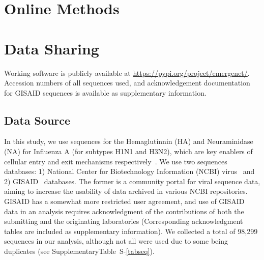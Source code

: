 \documentclass[onecolumn, compsoc,10pt]{IEEEtran}
\def\SUPPLEMENTARY{Supplementary}
\def\METHODS{Online Methods\xspace}
\begin{document}
\section*{\METHODS}






\section*{Data Sharing} 

Working software is publicly available at \href{https://pypi.org/project/quasinet/}{https://pypi.org/project/emergenet/}.
Accession numbers of all sequences used, and acknowledgement documentation for GISAID sequences is available as supplementary information.





\subsection*{Data Source}

In this study, we use sequences for the Hemaglutinnin (HA)  and Neuraminidase (NA) for Influenza A (for subtypes H1N1 and H3N2), which are key enablers of cellular entry and exit mechanisms respectively~\cite{mcauley2019influenza}. We use two sequences databases: 1) National Center for Biotechnology Information (NCBI) virus~\cite{hatcher2017virus} and 2) GISAID~\cite{bogner2006global} databases. The former is a community portal for viral sequence data, aiming to increase the usability of data archived in various NCBI repositories. GISAID has a somewhat more restricted user agreement, and use of GISAID data in an analysis requires acknowledgment of the contributions of both the submitting and the originating laboratories (Corresponding acknowledgment tables are included as supplementary information). We collected a total of 98,299 sequences in our analysis, although not all were used due to some being duplicates (see \SUPPLEMENTARY Table~S-\ref{tabseq}).




% 
% 




\clearpage                                                                      
\setcounter{figure}{0}                                    \renewcommand{\figurename}{Extended Data Figure}                               
\setcounter{table}{0}                                     
\renewcommand{\tablename}{Extended Data Table}                                 

\end{document}
